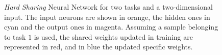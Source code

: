 \begin{figure}[t!]
    \caption{\emph{Hard Sharing} Neural Network for two tasks and a two-dimensional input. 
    The input neurons are shown in orange, the hidden ones in cyan and the output ones in magenta.
    Assuming a sample belonging to task $1$ is used, the shared weights updated in training are represented in red, and in blue the updated specific weights. 
    }
    \label{fig:hardsharing_nn}
\end{figure}